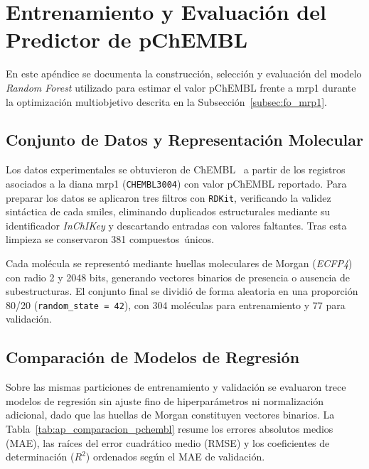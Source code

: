 \chapter{Entrenamiento y Evaluación del Predictor de pChEMBL}
\label{ap:predictor_pchembl}

En este apéndice se documenta la construcción, selección y evaluación del modelo \textit{Random Forest} utilizado para estimar el valor $\text{pChEMBL}$ frente a \gls{mrp1} durante la optimización multiobjetivo descrita en la Subsección~\ref{subsec:fo_mrp1}.

\section{Conjunto de Datos y Representación Molecular}
\label{sec:ap_rf_datos}

Los datos experimentales se obtuvieron de ChEMBL~\cite{mendez2019chembl} a partir de los registros asociados a la diana \gls{mrp1} (\texttt{CHEMBL3004}) con valor $\text{pChEMBL}$ reportado. Para preparar los datos se aplicaron tres filtros con \texttt{RDKit}, verificando la validez sintáctica de cada \gls{smiles}, eliminando duplicados estructurales mediante su identificador \textit{InChIKey} y descartando entradas con valores faltantes. Tras esta limpieza se conservaron 381 compuestos~únicos.

Cada molécula se representó mediante huellas moleculares de Morgan (\textit{ECFP4}) con radio 2 y 2048 bits, generando vectores binarios de presencia o ausencia de subestructuras. El conjunto final se dividió de forma aleatoria en una proporción 80/20 (\texttt{random\_state = 42}), con 304 moléculas para entrenamiento y 77 para validación.

\section{Comparación de Modelos de Regresión}
\label{sec:ap_rf_comparacion}

Sobre las mismas particiones de entrenamiento y validación se evaluaron trece modelos de regresión sin ajuste fino de hiperparámetros ni normalización adicional, dado que las huellas de Morgan constituyen vectores binarios. La Tabla~\ref{tab:ap_comparacion_pchembl} resume los errores absolutos medios (MAE), las raíces del error cuadrático medio (RMSE) y los coeficientes de determinación ($R^2$) ordenados según el MAE de validación.

